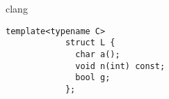 %
%
%
%
%

\begin{frame}[fragile]{clang}
  \begin{lstlisting}[basicstyle=\Large\ttfamily]
            template<typename C>
            struct L {
              char a();
              void n(int) const;
              bool g;
            };
  \end{lstlisting}
\end{frame}

